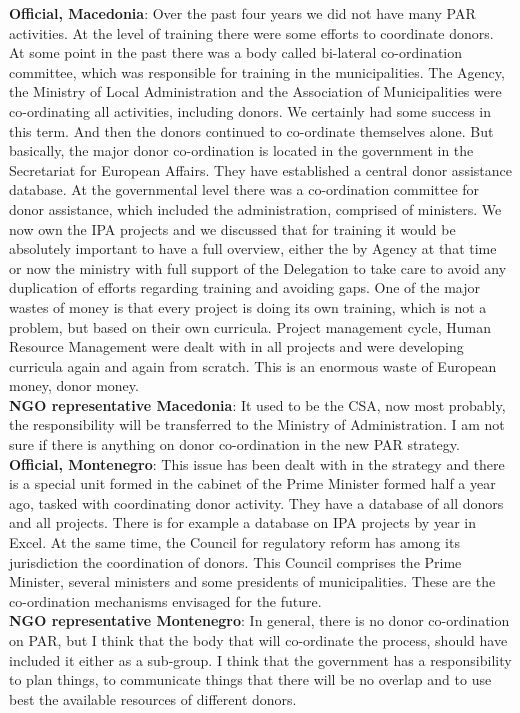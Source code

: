 \textbf{Official, Macedonia}: Over the past four years we did not have many PAR activities. At the level of training there were some efforts to coordinate donors. At some point in the past there was a body called bi-lateral co-ordination committee, which was responsible for training in the municipalities. The Agency, the Ministry of Local Administration and the Association of Municipalities were co-ordinating all activities, including donors. We certainly had some success in this term. And then the donors continued to co-ordinate themselves alone. But basically, the major donor co-ordination is located in the government in the Secretariat for European Affairs. They have established a central donor assistance database. At the governmental level there was a co-ordination committee for donor assistance, which included the administration, comprised of ministers. We now own the IPA projects and we discussed that for training it would be absolutely important to have a full overview,  either the by Agency at that time or now the ministry with full support of the Delegation to take care to avoid any duplication of efforts regarding training and avoiding gaps. One of the major wastes of money is that every project is doing its own training, which is not a problem, but based on their own curricula. Project management cycle, Human Resource Management were dealt with in all projects and were developing curricula again and again from scratch. This is an enormous waste of European money, donor money. \\
\textbf{NGO representative Macedonia}: It used to be the CSA, now most probably, the responsibility will be transferred to the Ministry of Administration. I am not sure if there is anything on donor co-ordination in the new PAR strategy. \\
\textbf{Official, Montenegro}: This issue has been dealt with in the strategy and there is a special unit formed in the cabinet of the Prime Minister formed half a year ago, tasked with coordinating donor activity. They have a database of all donors and all projects. There is for example a database on IPA projects by year in Excel. At the same time, the Council for regulatory reform has among its jurisdiction the coordination of donors. This Council comprises the Prime Minister, several ministers and some presidents of municipalities. These are the co-ordination mechanisms envisaged for the future.  \\
\textbf{NGO representative Montenegro}: In general, there is no donor co-ordination on PAR, but I think that the body that will co-ordinate the process, should have included it either as a sub-group. I think that the government has a responsibility to plan things, to communicate things that there will be no overlap and to use best the available resources of different donors.%
